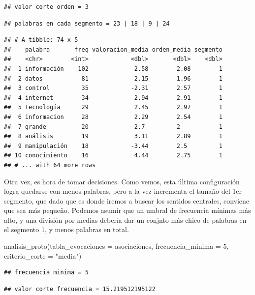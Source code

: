 \documentclass[
]{book}
\newenvironment{Shaded}{\begin{snugshade}}{\end{snugshade}}
\newcommand{\AttributeTok}[1]{\textcolor[rgb]{0.77,0.63,0.00}{#1}}
\newcommand{\DecValTok}[1]{\textcolor[rgb]{0.00,0.00,0.81}{#1}}
\newcommand{\FunctionTok}[1]{\textcolor[rgb]{0.00,0.00,0.00}{#1}}
\newcommand{\NormalTok}[1]{#1}
\newcommand{\StringTok}[1]{\textcolor[rgb]{0.31,0.60,0.02}{#1}}
\begin{document}
\begin{verbatim}
## valor corte orden = 3
\end{verbatim}

\begin{verbatim}
## palabras en cada segmento = 23 | 18 | 9 | 24
\end{verbatim}

\begin{verbatim}
## # A tibble: 74 x 5
##    palabra       freq valoracion_media orden_media segmento
##    <chr>        <int>            <dbl>       <dbl>    <dbl>
##  1 información    102             2.58        2.08        1
##  2 datos           81             2.15        1.96        1
##  3 control         35            -2.31        2.57        1
##  4 internet        34             2.94        2.91        1
##  5 tecnología      29             2.45        2.97        1
##  6 informacion     28             2.29        2.54        1
##  7 grande          20             2.7         2           1
##  8 análisis        19             3.11        2.89        1
##  9 manipulación    18            -3.44        2.5         1
## 10 conocimiento    16             4.44        2.75        1
## # ... with 64 more rows
\end{verbatim}

Otra vez, es hora de tomar decisiones. Como vemos, esta última configuración logra quedarse con menos palabras, pero a la vez incrementa el tamaño del 1er segmento, que dado que es donde iremos a buscar los sentidos centrales, conviene que sea más pequeño. Podemos asumir que un umbral de frecuencia mínimas más alto, y una división por medias debería dar un conjnto más chico de palabras en el segmento 1, y menos palabras en total.

\begin{Shaded}
\begin{Highlighting}[]
\FunctionTok{analisis\_proto}\NormalTok{(}\AttributeTok{tabla\_evocaciones =}\NormalTok{ asociaciones, }\AttributeTok{frecuencia\_minima =} \DecValTok{5}\NormalTok{, }\AttributeTok{criterio\_corte =} \StringTok{"media"}\NormalTok{)}
\end{Highlighting}
\end{Shaded}

\begin{verbatim}
## frecuencia minima = 5
\end{verbatim}

\begin{verbatim}
## valor corte frecuencia = 15.219512195122
\end{verbatim}
\end{document}
